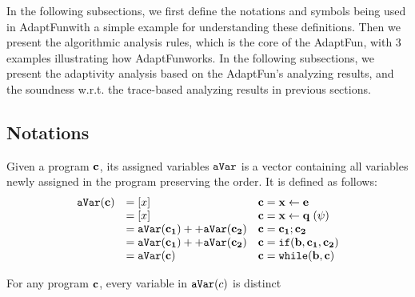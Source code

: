 \documentclass[a4paper,11pt]{article}
\newcommand{\THESYSTEM}{\textsf{AdaptFun}}
\begin{document}
In the following subsections, 
we first define the notations and symbols being used in \THESYSTEM  with a simple example for understanding these definitions. 
Then we present the algorithmic analysis rules, which is the core of the \THESYSTEM, with
3 examples illustrating how \THESYSTEM  works.
In the following subsections, we present the adaptivity analysis based on the \THESYSTEM's analyzing results, and the soundness w.r.t. the trace-based analyzing results in previous sections.

\subsection{Notations}
%
\label{subsec:alg_notation}
%
\begin{defn}
Given a program $\mathbf{{c}}$, its assigned variables $\mathtt{aVar}$ is a vector containing all variables newly assigned in the program preserving the order. It is defined as follows: 
$$
\begin{array}{lll}
   \mathtt{aVar}(\mathbf{{c}}) 	
   		& = [x] 									& \mathbf{{c}} 	= \mathbf{{\mathrel{ x \leftarrow e }}} \\
     	& = [x] 									& \mathbf{{c}} 	= \mathbf{{\mathrel{ x \leftarrow q }(\psi)}} \\
     	& = \mathtt{aVar}(\mathbf{{c_1}}) ++ \mathtt{aVar} (\mathbf{{c_2}}) 	& \mathbf{{c}} 	= \mathbf{{c_1}};\mathbf{{c_2}}\\
     	& = \mathtt{aVar}(\mathbf{{c_1}}) ++ \mathtt{aVar} (\mathbf{{c_2}}) 	& \mathbf{{c}} 	= \mathbf{{\mathtt{if} (b , c_1, c_2}}) \\
     	& = \mathtt{aVar}(\mathbf{{c}}) 							& \mathbf{{c}} 	= \mathbf{{\mathtt{while} (b,\mathbf{{c}})}}
\end{array}
$$
\end{defn}
%
\begin{lem}
For any program $\mathbf{{c}}$, every variable in $\mathtt{aVar}(c)$ is distinct
\end{lem}
\end{document}
